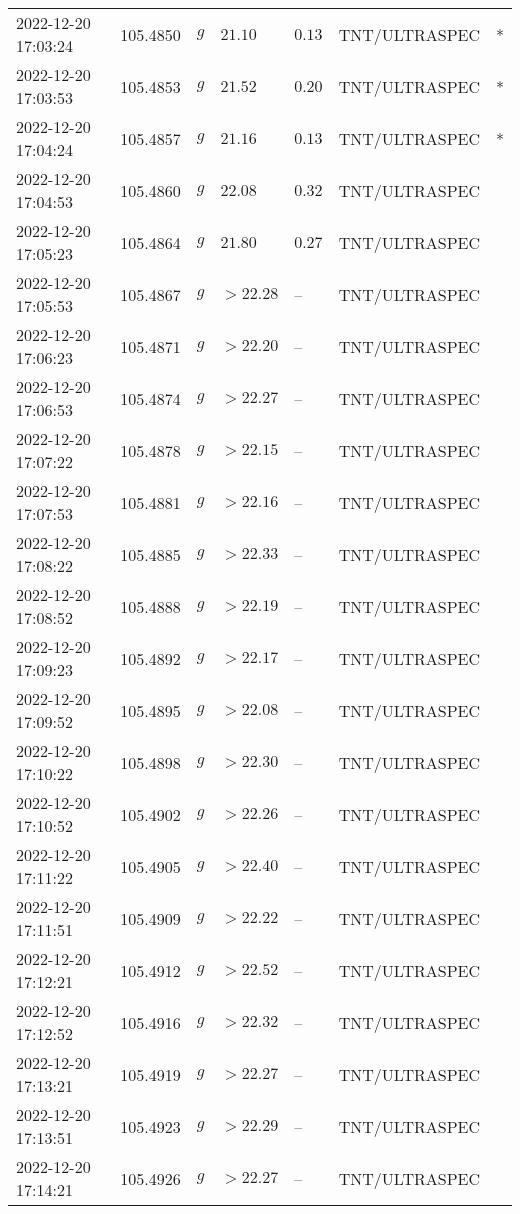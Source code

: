 \documentclass{nature_plusfigure}
\begin{document}
\begin{supplement}
\begin{center}
\begin{longtable}{lllllll}
2022-12-20 17:03:24 & 105.4850 & $g$ & $21.10$ & $0.13$ & TNT/ULTRASPEC & * \\ 
2022-12-20 17:03:53 & 105.4853 & $g$ & $21.52$ & $0.20$ & TNT/ULTRASPEC & * \\ 
2022-12-20 17:04:24 & 105.4857 & $g$ & $21.16$ & $0.13$ & TNT/ULTRASPEC & * \\ 
2022-12-20 17:04:53 & 105.4860 & $g$ & $22.08$ & $0.32$ & TNT/ULTRASPEC &  \\ 
2022-12-20 17:05:23 & 105.4864 & $g$ & $21.80$ & $0.27$ & TNT/ULTRASPEC &  \\ 
2022-12-20 17:05:53 & 105.4867 & $g$ & $>22.28$ & -- & TNT/ULTRASPEC &  \\ 
2022-12-20 17:06:23 & 105.4871 & $g$ & $>22.20$ & -- & TNT/ULTRASPEC &  \\ 
2022-12-20 17:06:53 & 105.4874 & $g$ & $>22.27$ & -- & TNT/ULTRASPEC &  \\ 
2022-12-20 17:07:22 & 105.4878 & $g$ & $>22.15$ & -- & TNT/ULTRASPEC &  \\ 
2022-12-20 17:07:53 & 105.4881 & $g$ & $>22.16$ & -- & TNT/ULTRASPEC &  \\ 
2022-12-20 17:08:22 & 105.4885 & $g$ & $>22.33$ & -- & TNT/ULTRASPEC &  \\ 
2022-12-20 17:08:52 & 105.4888 & $g$ & $>22.19$ & -- & TNT/ULTRASPEC &  \\ 
2022-12-20 17:09:23 & 105.4892 & $g$ & $>22.17$ & -- & TNT/ULTRASPEC &  \\ 
2022-12-20 17:09:52 & 105.4895 & $g$ & $>22.08$ & -- & TNT/ULTRASPEC &  \\ 
2022-12-20 17:10:22 & 105.4898 & $g$ & $>22.30$ & -- & TNT/ULTRASPEC &  \\ 
2022-12-20 17:10:52 & 105.4902 & $g$ & $>22.26$ & -- & TNT/ULTRASPEC &  \\ 
2022-12-20 17:11:22 & 105.4905 & $g$ & $>22.40$ & -- & TNT/ULTRASPEC &  \\ 
2022-12-20 17:11:51 & 105.4909 & $g$ & $>22.22$ & -- & TNT/ULTRASPEC &  \\ 
2022-12-20 17:12:21 & 105.4912 & $g$ & $>22.52$ & -- & TNT/ULTRASPEC &  \\ 
2022-12-20 17:12:52 & 105.4916 & $g$ & $>22.32$ & -- & TNT/ULTRASPEC &  \\ 
2022-12-20 17:13:21 & 105.4919 & $g$ & $>22.27$ & -- & TNT/ULTRASPEC &  \\ 
2022-12-20 17:13:51 & 105.4923 & $g$ & $>22.29$ & -- & TNT/ULTRASPEC &  \\ 
2022-12-20 17:14:21 & 105.4926 & $g$ & $>22.27$ & -- & TNT/ULTRASPEC &  \\ 

\end{longtable}
\end{center}
\end{supplement}
\end{document}
